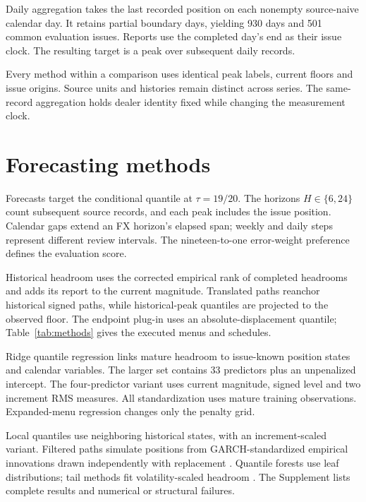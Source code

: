 \documentclass[11pt,a4paper]{article}
\begin{document}
Daily aggregation takes the last recorded position on each nonempty source-naive calendar day. It retains partial boundary days, yielding 930 days and 501 common evaluation issues. Reports use the completed day's end as their issue clock. The resulting target is a peak over subsequent daily records.

Every method within a comparison uses identical peak labels, current floors and issue origins. Source units and histories remain distinct across series. The same-record aggregation holds dealer identity fixed while changing the measurement clock.

\FloatBarrier

\section{Forecasting methods}\label{sec:methods}

Forecasts target the conditional quantile at \(\tau=19/20\). The horizons \(H\in\{6,24\}\) count subsequent source records, and each peak includes the issue position. Calendar gaps extend an FX horizon's elapsed span; weekly and daily steps represent different review intervals. The nineteen-to-one error-weight preference defines the evaluation score.

Historical headroom uses the corrected empirical rank of completed headrooms and adds its report to the current magnitude. Translated paths reanchor historical signed paths, while historical-peak quantiles are projected to the observed floor. The endpoint plug-in uses an absolute-displacement quantile; Table~\ref{tab:methods} gives the executed menus and schedules.

Ridge quantile regression links mature headroom to issue-known position states and calendar variables. The larger set contains 33 predictors plus an unpenalized intercept. The four-predictor variant uses current magnitude, signed level and two increment RMS measures. All standardization uses mature training observations. Expanded-menu regression changes only the penalty grid.

Local quantiles use neighboring historical states, with an increment-scaled variant. Filtered paths simulate positions from GARCH-standardized empirical innovations drawn independently with replacement \citep{hull1998,barone1999}. Quantile forests use leaf distributions; tail methods fit volatility-scaled headroom \citep{meinshausen2006,mcneilfrey2000}. The Supplement lists complete results and numerical or structural failures.
\end{document}
